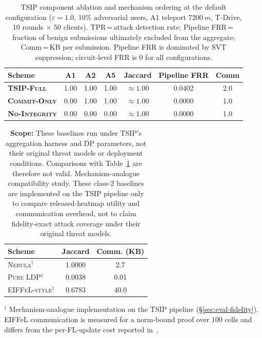 \documentclass[conference]{IEEEtran}
\theoremstyle{definition}
\theoremstyle{plain}
\begin{document}
\begin{table}[t]
\centering
\caption{TSIP component ablation and mechanism ordering at the default configuration ($\varepsilon{=}1.0$, 10\% adversarial users, A1 teleport $\SI{7200}{m}$, T-Drive, 10 rounds $\times$ 50 clients). TPR\,=\,attack detection rate; Pipeline FRR\,=\,fraction of benign submissions ultimately excluded from the aggregate; Comm\,=\,KB per submission. Pipeline FRR is dominated by SVT suppression; circuit-level FRR is 0 for all configurations.}
\label{tab:ablation-headline}
\scriptsize
\setlength{\tabcolsep}{3pt}
\begin{tabularx}{\columnwidth}{@{}Y c c c c c c@{}}
\toprule
\textbf{Scheme} & \textbf{A1} & \textbf{A2} & \textbf{A5} & \textbf{Jaccard} & \textbf{Pipeline FRR} & \textbf{Comm} \\
\midrule
\textbf{\textsc{TSIP-Full}}    & 1.00 & 1.00 & 1.00 & $\approx 1.00$ & 0.0402 & 2.0 \\
\textbf{\textsc{Commit-Only}}  & 0.00 & 1.00 & 1.00 & $\approx 1.00$ & 0.0000 & 1.0 \\
\textbf{\textsc{No-Integrity}} & 0.00 & 0.00 & 0.00 & $\approx 1.00$ & 0.0000 & 1.0 \\
\bottomrule
\end{tabularx}
\end{table}

\begin{table}[t]
\centering
\caption{\textbf{Scope:} These baselines run under TSIP's aggregation harness and DP parameters, not their original threat models or deployment conditions. Comparisons with Table~\ref{tab:ablation-headline} are therefore not valid. Mechanism-analogue compatibility study. These class-2 baselines are implemented on the TSIP pipeline only to compare released-heatmap utility and communication overhead, not to claim fidelity-exact attack coverage under their original threat models.}
\label{tab:mechanism-compatibility}
\footnotesize
\setlength{\tabcolsep}{4pt}
\begin{tabularx}{\columnwidth}{@{}Y c c@{}}
\toprule
\textbf{Scheme} & \textbf{Jaccard} & \textbf{Comm. (KB)} \\
\midrule
\textsc{Nebula}$^\dagger$       & 1.0000 & 2.7  \\
\textsc{Pure LDP}$^\dagger$     & 0.0038 & 0.01 \\
\textsc{EIFFeL-style}$^\dagger$ & 0.6783 & 40.0 \\
\bottomrule
\end{tabularx}
\vspace{0.3em}
{\footnotesize $^\dagger$ Mechanism-analogue implementation on the TSIP pipeline (\S\ref{sec:eval-fidelity}).
EIFFeL communication is measured for a norm-bound proof over 100 cells and differs from the per-FL-update cost reported in~\cite{Chowdhury2022EIFFeL}.}
\end{table}
\end{document}
